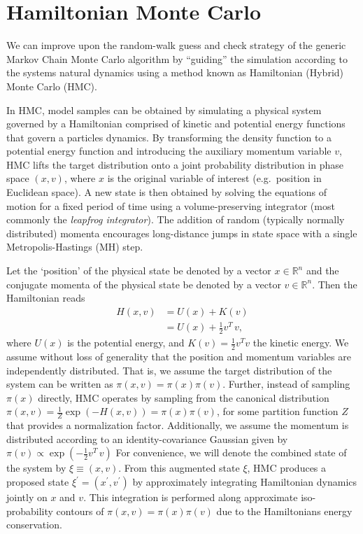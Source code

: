\section{Hamiltonian Monte Carlo}%
\label{sec:l2hmc_hmc}
We can improve upon the random-walk guess and check strategy of the generic
Markov Chain Monte Carlo algorithm by ``guiding'' the simulation according to
the systems natural dynamics using a method known as Hamiltonian (Hybrid)
Monte Carlo (HMC).

In HMC, model samples can be obtained by simulating a physical system
governed by a Hamiltonian comprised of kinetic and potential energy functions
that govern a particles dynamics.
%
By transforming the density function to a potential energy function and
introducing the auxiliary momentum variable $v$, HMC lifts the target
distribution onto a joint probability distribution in phase space $(x, v)$,
where $x$ is the original variable of interest (e.g.\ position in Euclidean
space).
%
A new state is then obtained by solving the equations of motion for a fixed
period of time using a volume-preserving integrator (most commonly the
\emph{leapfrog integrator}).
%
The addition of random (typically normally distributed) momenta encourages
long-distance jumps in state space with a single Metropolis-Hastings (MH)
step.

Let the `position' of the physical state be denoted by a vector $x
\in\mathbb{R}^{n}$ and the conjugate momenta of the physical state be denoted
by a vector $v \in\mathbb{R}^{n}$.
%
Then the Hamiltonian reads
%
\begin{align}
  H(x, v) &= U(x) + K(v)\\
                    & = U(x) + \frac{1}{2} v^{T} \,v,
  \label{eq:hamiltonian}
\end{align}
%
where $U(x)$ is the potential energy, and $K(v)=\frac{1}{2}v^{T}v$ the
kinetic energy.%
%
We assume without loss of generality that the position and momentum variables
are independently distributed.
%
That is, we assume the target distribution of the system can be written as
$\pi(x, v) = \pi(x) \pi(v)$.
%
Further, instead of sampling $\pi(x)$ directly, HMC operates by sampling from the
canonical distribution $\pi(x, v) = \frac{1}{Z} \exp(-H(x, v)) = \pi(x)
\pi(v)$, for some partition function $Z$ that provides a normalization factor.
%
Additionally, we assume the momentum is distributed according to an
identity-covariance Gaussian given by $\pi(v) \propto \exp{(-\frac{1}{2} v^{T} \,
v)}$ For convenience, we will denote the combined state of the system by $\xi
\equiv (x, v)$.
%
From this augmented state $\xi$, HMC produces a proposed state $\xi^{\prime} =
(x^{\prime}, v^{\prime})$ by approximately integrating Hamiltonian dynamics
jointly on $x$ and $v$.
%
This integration is performed along approximate iso-probability contours of
$\pi(x, v) = \pi(x) \pi(v)$ due to the Hamiltonians energy conservation.
%
